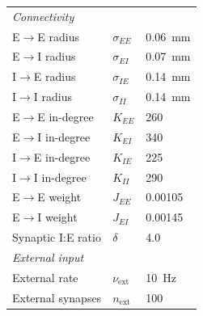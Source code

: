 \documentclass[%
	preprint, %
	amsmath,
	amssymb,
	aps,
	prx,
	floatfix,
	11pt %
]{revtex4-2}
\begin{document}
\begin{table}[h]
\begin{tabular}{lll}
\hline
\multicolumn{3}{l}{\textit{Connectivity}} \\
E$\to$E radius & $\sigma_{EE}$ & \SI{0.06}{\milli\metre} \\
E$\to$I radius & $\sigma_{EI}$ & \SI{0.07}{\milli\metre} \\
I$\to$E radius & $\sigma_{IE}$ & \SI{0.14}{\milli\metre} \\
I$\to$I radius & $\sigma_{II}$ & \SI{0.14}{\milli\metre} \\
E$\to$E in-degree & $K_{EE}$ & \num{260} \\
E$\to$I in-degree & $K_{EI}$ & \num{340} \\
I$\to$E in-degree & $K_{IE}$ & \num{225} \\
I$\to$I in-degree & $K_{II}$ & \num{290} \\
E$\to$E weight & $J_{EE}$ & \num{0.00105} \\
E$\to$I weight & $J_{EI}$ & \num{0.00145} \\
Synaptic I:E ratio & $\delta$ & \num{4.0} \\
\hline
\multicolumn{3}{l}{\textit{External input}} \\
External rate & $\nu_{\mathrm{ext}}$ & \SI{10}{\hertz} \\
External synapses & $n_{\mathrm{ext}}$ & \num{100} \\
\hline
\end{tabular}
\end{table}
\end{document}

